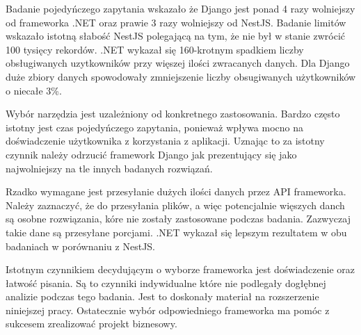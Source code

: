 Badanie pojedyńczego zapytania wskazało że Django jest ponad 4 razy wolniejszy od frameworka .NET oraz prawie 3 razy wolniejszy od NestJS.
Badanie limitów wskazało istotną słabość NestJS polegającą na tym, że nie był w stanie zwrócić 100 tysięcy rekordów. 
.NET wykazał się 160-krotnym spadkiem liczby obsługiwanych uzytkowników przy więszej ilości zwracanych danych.
Dla Django duże zbiory danych spowodowały zmniejszenie liczby obsugiwanych użytkowników o niecałe 3\%.

Wybór narzędzia jest uzależniony od konkretnego zastosowania.
Bardzo często istotny jest czas pojedyńczego zapytania, ponieważ wpływa mocno na doświadczenie użytkownika z korzystania z aplikacji.
Uznając to za istotny czynnik należy odrzucić framework Django jak prezentujący się jako najwolniejszy na tle innych badanych rozwiązań.

Rzadko wymagane jest przesyłanie dużych ilości danych przez API frameworka.
Należy zaznaczyć, że do przesyłania plików, a więc potencjalnie więszych danch są osobne rozwiązania, kóre nie zostały zastosowane podczas badania.
Zazwyczaj takie dane są przesyłane porcjami.
.NET wykazał się lepszym rezultatem w obu badaniach w porównaniu z NestJS.

Istotnym czynnikiem decydującym o wyborze frameworka jest doświadczenie oraz łatwość pisania.
Są to czynniki indywidualne które nie podlegały dogłębnej analizie podczas tego badania.
Jest to doskonały materiał na rozszerzenie niniejszej pracy.
Ostatecznie wybór odpowiedniego frameworka ma pomóc z sukcesem zrealizować projekt biznesowy.